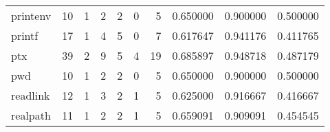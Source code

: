 \begin{tabular}{lrrrrrrrrr}
printenv  &                                      10 &                                                  1 &                                                  2 &                                                  2 &                                                  0 &                                                  5 &                                           0.650000 &                               0.900000 &                             0.500000 \\
printf    &                                      17 &                                                  1 &                                                  4 &                                                  5 &                                                  0 &                                                  7 &                                           0.617647 &                               0.941176 &                             0.411765 \\
ptx       &                                      39 &                                                  2 &                                                  9 &                                                  5 &                                                  4 &                                                 19 &                                           0.685897 &                               0.948718 &                             0.487179 \\
pwd       &                                      10 &                                                  1 &                                                  2 &                                                  2 &                                                  0 &                                                  5 &                                           0.650000 &                               0.900000 &                             0.500000 \\
readlink  &                                      12 &                                                  1 &                                                  3 &                                                  2 &                                                  1 &                                                  5 &                                           0.625000 &                               0.916667 &                             0.416667 \\
realpath  &                                      11 &                                                  1 &                                                  2 &                                                  2 &                                                  1 &                                                  5 &                                           0.659091 &                               0.909091 &                             0.454545 \\

\end{tabular}
